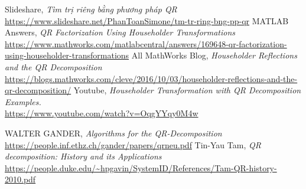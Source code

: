 \begin{thebibliography}{99}
\bibitem{} Slideshare, {\it Tìm trị riêng bằng phương pháp QR}\\ \url{https://www.slideshare.net/PhanToanSimone/tm-tr-ring-bng-pp-qr}
\bibitem{} MATLAB Answers, {\it QR Factorization Using Householder Transformations}\\ \url{https://www.mathworks.com/matlabcentral/answers/169648-qr-factorization-using-householder-transformations}
\bibitem{} All MathWorks Blog, {\it Householder Reflections and the QR Decomposition}\\ \url{https://blogs.mathworks.com/cleve/2016/10/03/householder-reflections-and-the-qr-decomposition/}
\bibitem{} Youtube, {\it Householder Transformation with QR Decomposition Examples.}\\ \url{https://www.youtube.com/watch?v=OqgYYqy0M4w}

\bibitem{} WALTER GANDER, {\it Algorithms for the QR-Decomposition}\\ \url{https://people.inf.ethz.ch/gander/papers/qrneu.pdf}
\bibitem{} Tin-Yau Tam, {\it QR decomposition: History and its
	Applications}\\ \url{https://people.duke.edu/~hpgavin/SystemID/References/Tam-QR-history-2010.pdf}


\end{thebibliography}
